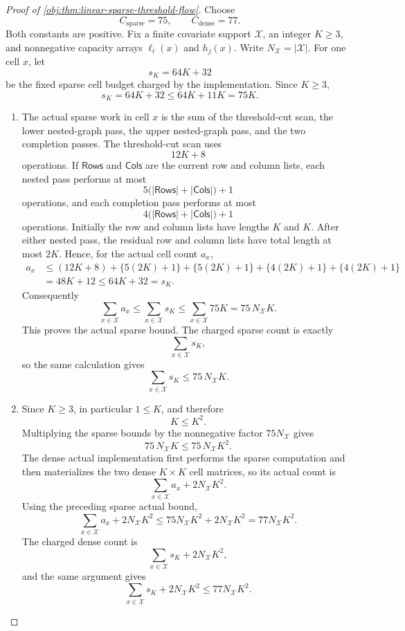 \begin{proof}[Proof of \cref{obj:thm:linear-sparse-threshold-flow}]
Choose
\[
C_{\mathrm{sparse}}=75,
\qquad
C_{\mathrm{dense}}=77 .
\]
Both constants are positive.  Fix a finite covariate support \(\mathcal X\), an integer \(K\ge 3\), and nonnegative capacity arrays \(\ell_i(x)\) and \(h_j(x)\).  Write \(N_{\mathcal X}=|\mathcal X|\).  For one cell \(x\), let
\[
s_K=64K+32
\]
be the fixed sparse cell budget charged by the implementation.  Since \(K\ge3\),
\[
s_K=64K+32\le 64K+11K=75K .
\]

\begin{enumerate}
\item The actual sparse work in cell \(x\) is the sum of the threshold-cut scan, the lower nested-graph pass, the upper nested-graph pass, and the two completion passes.  The threshold-cut scan uses
\[
12K+8
\]
operations.  If \(\mathsf{Rows}\) and \(\mathsf{Cols}\) are the current row and column lists, each nested pass performs at most
\[
5\bigl(|\mathsf{Rows}|+|\mathsf{Cols}|\bigr)+1
\]
operations, and each completion pass performs at most
\[
4\bigl(|\mathsf{Rows}|+|\mathsf{Cols}|\bigr)+1
\]
operations.  Initially the row and column lists have lengths \(K\) and \(K\).  After either nested pass, the residual row and column lists have total length at most \(2K\).  Hence, for the actual cell count \(a_x\),
\[
\begin{aligned}
a_x
&\le (12K+8)+\{5(2K)+1\}+\{5(2K)+1\}
      +\{4(2K)+1\}+\{4(2K)+1\}  \\
&=48K+12
\le 64K+32=s_K .
\end{aligned}
\]
Consequently
\[
\sum_{x\in\mathcal X} a_x
\le \sum_{x\in\mathcal X}s_K
\le \sum_{x\in\mathcal X}75K
=75\,N_{\mathcal X}K .
\]
This proves the actual sparse bound.  The charged sparse count is exactly
\[
\sum_{x\in\mathcal X}s_K,
\]
so the same calculation gives
\[
\sum_{x\in\mathcal X}s_K\le 75\,N_{\mathcal X}K .
\]

\item Since \(K\ge3\), in particular \(1\le K\), and therefore
\[
K\le K^2 .
\]
Multiplying the sparse bounds by the nonnegative factor \(75N_{\mathcal X}\) gives
\[
75\,N_{\mathcal X}K\le 75\,N_{\mathcal X}K^2 .
\]
The dense actual implementation first performs the sparse computation and then materializes the two dense \(K\times K\) cell matrices, so its actual count is
\[
\sum_{x\in\mathcal X}a_x+2N_{\mathcal X}K^2 .
\]
Using the preceding sparse actual bound,
\[
\sum_{x\in\mathcal X}a_x+2N_{\mathcal X}K^2
\le 75N_{\mathcal X}K^2+2N_{\mathcal X}K^2
=77N_{\mathcal X}K^2 .
\]
The charged dense count is
\[
\sum_{x\in\mathcal X}s_K+2N_{\mathcal X}K^2,
\]
and the same argument gives
\[
\sum_{x\in\mathcal X}s_K+2N_{\mathcal X}K^2
\le 77N_{\mathcal X}K^2 .
\]


\end{enumerate}
\end{proof}
